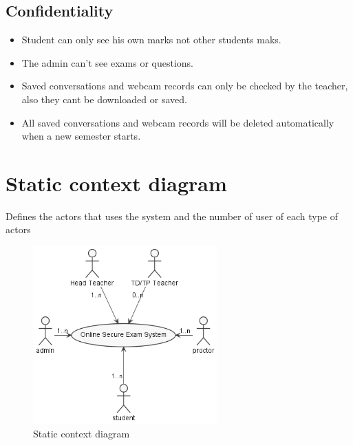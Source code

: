 \documentclass[]{uc2pfecaneva}
\begin{document}
    \raggedright\subsection{Confidentiality}
    \begin{itemize}
        \item Student can only see his own marks not other students maks.
        \item The admin can’t see exams or questions.
        \item Saved conversations and webcam records can only be checked by the teacher, also they cant be downloaded or saved.
        \item All saved conversations and webcam records will be deleted automatically when a new semester starts.
    \end{itemize}

    \raggedright\section{Static context diagram}
    Defines the actors that uses the system and the number of user of each type of actors
    \begin{figure}[h]

        \centering
        \includegraphics[width=200pt]{images/SCD}
        \caption{Static context diagram}
    \end{figure}


\end{document}
